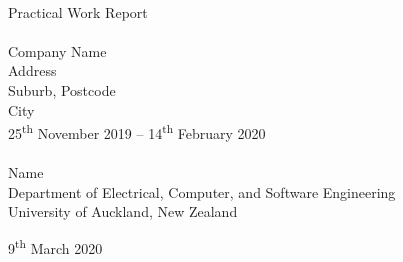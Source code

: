 \begin{titlepage}
\begin{center}

~\\\vspace{3cm}
{\huge Practical Work Report}\\[2cm]

\HRule \\[0.5cm]
{\LARGE Company Name}\\[0.3cm]
{\large Address\\
Suburb, Postcode\\
City}\\[0.3cm]
25\textsuperscript{th} November 2019 -- 14\textsuperscript{th} February 2020\\[0.3cm]
\HRule \\[2cm]

{\large Name}\\[0.5cm]
Department of Electrical, Computer, and Software Engineering\\[0.2cm]
University of Auckland, New Zealand

\vfill
{\large 9\textsuperscript{th} March 2020}

\end{center}
\end{titlepage}